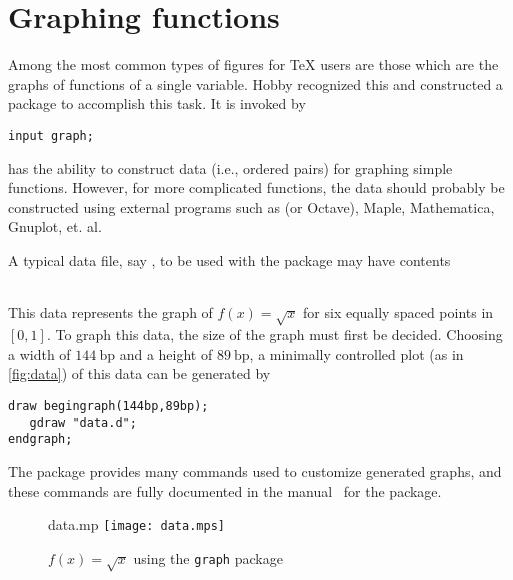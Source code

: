 \section{Graphing functions}
\label{sec:graphing}

Among the most common types of figures for \TeX{} users are those which
are the graphs of functions of a single variable.  Hobby recognized this
and constructed a package to accomplish this task.  It is invoked by

\begin{lstlisting}[style=MP]
input graph;
\end{lstlisting}

\MP{} has the ability to construct data (i.e., ordered pairs) for
graphing simple functions.  However, for more complicated functions, the
data should probably be constructed using external programs such as
 (or Octave), Maple, Mathematica, Gnuplot, et. al.

A typical data file, say , to be used with the 
package may have contents

\vspace{8pt}
\noindent%
\begin{tabular}[b]{@{\hspace{48pt}}l@{}}
  
\end{tabular}%
\qquad%
\vspace{8pt}

This data represents the graph of $f(x)=\sqrt{x}$ for six equally spaced
points in $[0,1]$.  To graph this data, the size of the graph must first
be decided.  Choosing a width of $144\mathrm{\ bp}$ and a height of
$89\mathrm{\ bp}$, a minimally controlled plot (as in
\autoref{fig:data}) of this data can be generated by

\begin{lstlisting}[style=MP]
draw begingraph(144bp,89bp);
   gdraw "data.d";
endgraph;
\end{lstlisting}

The  package provides many commands used to customize
generated graphs, and these commands are fully documented in the
manual~\cite{hobby:graph} for the  package.

\begin{figure}
  \begin{withattachment}{data.mp}
    \centering
    \texttt{[image: data.mps]}
  \end{withattachment}
  \caption{$f(x)=\sqrt{x}$ using the \texttt{graph} package}
  \label{fig:data}
\end{figure}
